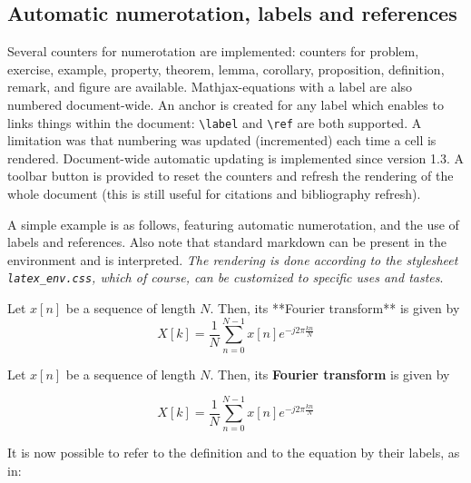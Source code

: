     \subsection{Automatic numerotation, labels and
references}\label{automatic-numerotation-labels-and-references}

    Several counters for numerotation are implemented: counters for problem,
exercise, example, property, theorem, lemma, corollary, proposition,
definition, remark, and figure are available. Mathjax-equations with a
label are also numbered document-wide. An anchor is created for any
label which enables to links things within the document:
\texttt{\textbackslash{}label} and \texttt{\textbackslash{}ref} are both
supported. A limitation was that numbering was updated (incremented)
each time a cell is rendered. Document-wide automatic updating is
implemented since version 1.3. A toolbar button is provided to reset the
counters and refresh the rendering of the whole document (this is still
useful for citations and bibliography refresh).

    \label{example:mixing} A simple example is as follows, featuring
automatic numerotation, and the use of labels and references. Also note
that standard markdown can be present in the environment and is
interpreted. \emph{The rendering is done according to the stylesheet
\texttt{latex\_env.css}, which of course, can be customized to specific
uses and tastes}.

\begin{listing}
\begin{definition} \label{def:FT}
Let $x[n]$ be a sequence of length $N$. Then, its **Fourier transform** is given by
\begin{equation}
\label{eq:FT}
X[k]= \frac{1}{N} \sum_{n=0}^{N-1} x[n] e^{-j2\pi \frac{kn}{N}}
\end{equation}
\end{definition}
\end{listing}

\begin{definition} \label{def:FT} Let \(x[n]\) be a sequence of
length \(N\). Then, its \textbf{Fourier transform} is given by

\begin{equation}
\label{eq:FT2}
X[k]= \frac{1}{N} \sum_{n=0}^{N-1} x[n] e^{-j2\pi \frac{kn}{N}}
\end{equation}

\end{definition}

    It is now possible to refer to the definition and to the equation by
their labels, as in:

